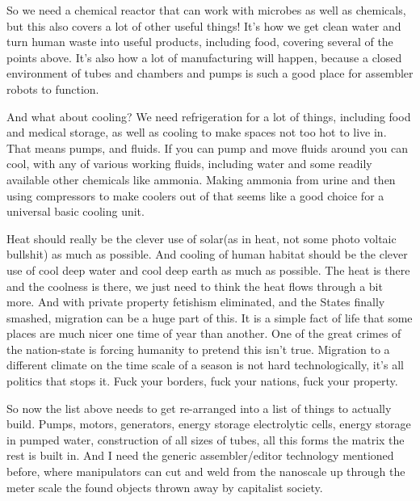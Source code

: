 So we need a chemical reactor that can work with microbes as well as
chemicals, but this also covers a lot of other useful things! It's how
we get clean water and turn human waste into useful products, including
food, covering several of the points above. It's also how a lot of
manufacturing will happen, because a closed environment of tubes and
chambers and pumps is such a good place for assembler robots to
function.

And what about cooling? We need refrigeration for a lot of things,
including food and medical storage, as well as cooling to make spaces
not too hot to live in. That means pumps, and fluids. If you can pump
and move fluids around you can cool, with any of various working fluids,
including water and some readily available other chemicals like ammonia.
Making ammonia from urine and then using compressors to make coolers out
of that seems like a good choice for a universal basic cooling unit.

Heat should really be the clever use of solar(as in heat, not some photo
voltaic bullshit) as much as possible. And cooling of human habitat
should be the clever use of cool deep water and cool deep earth as much
as possible. The heat is there and the coolness is there, we just need
to think the heat flows through a bit more. And with private property
fetishism eliminated, and the States finally smashed, migration can be a
huge part of this. It is a simple fact of life that some places are much
nicer one time of year than another. One of the great crimes of the
nation-state is forcing humanity to pretend this isn't true. Migration
to a different climate on the time scale of a season is not hard
technologically, it's all politics that stops it. Fuck your borders,
fuck your nations, fuck your property.

So now the list above needs to get re-arranged into a list of things to
actually build. Pumps, motors, generators, energy storage electrolytic
cells, energy storage in pumped water, construction of all sizes of
tubes, all this forms the matrix the rest is built in. And I need the
generic assembler/editor technology mentioned before, where manipulators
can cut and weld from the nanoscale up through the meter scale the found
objects thrown away by capitalist society.

